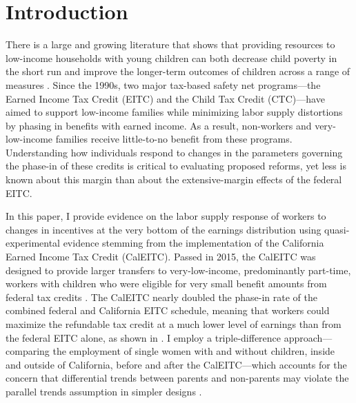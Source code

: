\documentclass[11pt]{article}
\let\Cref\crtCref
\begin{document}
\doublespacing


\section{Introduction} \label{sec:introduction}


There is a large and growing literature that shows that providing resources to low-income households with young children can both decrease child poverty in the short run and improve the longer-term outcomes of children across a range of measures \citep{duncan_roadmap_2019,page_new_2024}. Since the 1990s, two major tax-based safety net programs---the Earned Income Tax Credit (EITC) and the Child Tax Credit (CTC)---have aimed to support low-income families while minimizing labor supply distortions by phasing in benefits with earned income. As a result, non-workers and very-low-income families receive little-to-no benefit from these programs. Understanding how individuals respond to changes in the parameters governing the phase-in of these credits is critical to evaluating proposed reforms, yet less is known about this margin than about the extensive-margin effects of the federal EITC.


In this paper, I provide evidence on the labor supply response of workers to changes in incentives at the very bottom of the earnings distribution using quasi-experimental evidence stemming from the implementation of the California Earned Income Tax Credit (CalEITC). Passed in 2015, the CalEITC was designed to provide larger transfers to very-low-income, predominantly part-time, workers with children who were eligible for very small benefit amounts from federal tax credits \citep{rueben_upward_2017}. The CalEITC nearly doubled the phase-in rate of the combined federal and California EITC schedule, meaning that workers could maximize the refundable tax credit at a much lower level of earnings than from the federal EITC alone, as shown in \Cref{fig:fig_sch}. I employ a triple-difference approach---comparing the employment of single women with and without children, inside and outside of California, before and after the CalEITC---which accounts for the concern that differential trends between parents and non-parents may violate the parallel trends assumption in simpler designs \citep{kleven_eitc_2024}.
\end{document}
